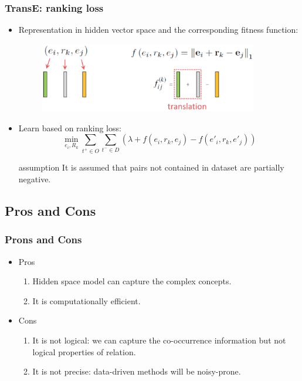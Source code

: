 \documentclass[pdf,10pt]{beamer}
\begin{document}
\begin{frame}
\frametitle{TransE: ranking loss}
\begin{itemize}
	\item Representation in hidden vector space and the corresponding fitness function:
		\begin{figure}
			\includegraphics[width=0.90\textwidth,height=0.30\textwidth]{6.eps}
		\end{figure}
	\item Learn based on ranking loss:
		\begin{equation}
			\min_{e_i,R_k}\sum_{t^+ \in O}\sum_{t^- \in D}{(\lambda + f(e_i,r_k,e_j) - f(e'_i,r_k,e'_j))}
		\end{equation}
	\begin{exampleblock}{assumption}
		It is assumed that pairs not contained in dataset are partially negative.
	\end{exampleblock}
\end{itemize}
\end{frame}

\subsection{Pros and Cons}
\begin{frame}
\frametitle{Prons and Cons}
\begin{itemize}
	\item Pros
		\begin{enumerate}
			\item Hidden space model can capture the complex concepts.
			\item It is computationally efficient.
		\end{enumerate}
	\item Cons
		\begin{enumerate}
			\item It is not logical: we can capture the co-occurrence information but not logical properties of relation.
			\item It is not precise: data-driven methods will be noisy-prone.
		\end{enumerate}
\end{itemize}
\end{frame}



\end{document}
